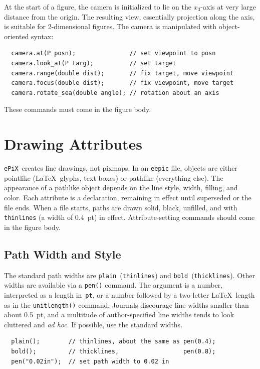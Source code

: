 \documentclass[12pt]{report}
\newcommand{\code}[1]{\texttt{#1}}
\newcommand{\ePiX}{\code{ePiX}}
\begin{document}
At the start of a figure, the camera is initialized to lie on the
$x_3$-axis at very large distance from the origin. The resulting view,
essentially projection along the axis, is suitable for 2-dimensional
figures. The camera is manipulated with object-oriented syntax:
\begin{verbatim}
  camera.at(P posn);               // set viewpoint to posn
  camera.look_at(P targ);          // set target
  camera.range(double dist);       // fix target, move viewpoint
  camera.focus(double dist);       // fix viewpoint, move target
  camera.rotate_sea(double angle); // rotation about an axis
\end{verbatim}
These commands must come in the figure body.


\section{Drawing Attributes}

\ePiX\ creates line drawings, not pixmaps.  In an \code{eepic} file,
objects are either pointlike (\LaTeX\ glyphs, text boxes) or pathlike
(everything else). The appearance of a pathlike object depends on the
line style, width, filling, and color. Each attribute
is a declaration, remaining in effect until superseded or the file
ends.  When a file starts, paths are drawn solid, black, unfilled, and
with \code{thinlines} (a width of $0.4$~pt) in effect.
Attribute-setting commands should come in the figure body.


\subsection*{Path Width and Style}

The standard path widths are \code{plain}~(\code{thinlines}) and
\code{bold}~(\code{thicklines}). Other widths are available via a
\code{pen()} command. The argument is a number, interpreted as a
length in~\code{pt}, or a number followed by a two-letter \LaTeX\ 
length as in the \code{unitlength()} command.  Journals discourage
line widths smaller than about 0.5~pt, and a multitude of
author-specified line widths tends to look cluttered and \emph{ad
  hoc}. If possible, use the standard widths.
\begin{verbatim}
  plain();        // thinlines, about the same as pen(0.4);
  bold();         // thicklines,                  pen(0.8);
  pen("0.02in");  // set path width to 0.02 in
\end{verbatim}
\end{document}
